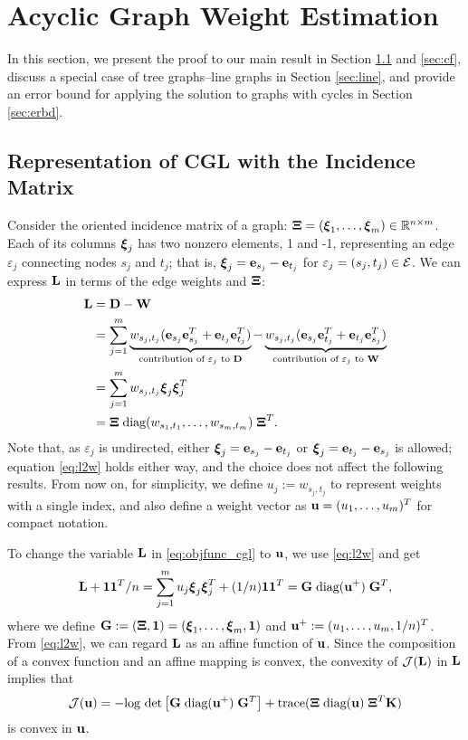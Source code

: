 \documentclass{article}
\begin{document}
\section{Acyclic Graph Weight Estimation}
\label{sec:glpest}
In this section, we present the proof to our main result in Section \ref{sec:represent} and \ref{sec:cf}, discuss a special case of tree graphs--line graphs in Section \ref{sec:line}, and provide an error bound for applying the solution to graphs with cycles in Section \ref{sec:erbd}.

\subsection{Representation of CGL with the Incidence Matrix}
\label{sec:represent}
Consider the oriented incidence matrix of a graph: $\hbox{\boldmath$\Xi$}=(\hbox{\boldmath$\xi$}_1,\dots,\hbox{\boldmath$\xi$}_m)\in\mathbb{R}^{n\times m}$. Each of its columns $\hbox{\boldmath$\xi$}_j$  has two nonzero elements, 1 and -1,  representing an edge $\varepsilon_j$ connecting nodes $s_j$ and $t_j$; that is, $\hbox{\boldmath$\xi$}_j={\bf e}_{s_j}-{\bf e}_{t_j}$ for $\varepsilon_j=(s_j,t_j)\in{\cal E}$. We can express ${\bf L}$ in terms of the edge weights and $\hbox{\boldmath$\Xi$}$:
\begin{align}
\label{eq:l2w}
  {\bf L} &= {\bf D}-{\bf W} \nonumber\\ 
  &=\sum_{j=1}^m \underbrace{w_{s_j,t_j}({\bf e}_{s_j}{\bf e}_{s_j}^T+{\bf e}_{t_j}{\bf e}_{t_j}^T)}_{\text{contribution of $\varepsilon_j$ to ${\bf D}$}} - \underbrace{w_{s_j,t_j}({\bf e}_{s_j}{\bf e}_{t_j}^T + {\bf e}_{t_j}{\bf e}_{s_j}^T)}_{\text{contribution of $\varepsilon_j$ to ${\bf W}$}} \nonumber\\
  &= \sum_{j=1}^m w_{s_j,t_j}\hbox{\boldmath$\xi$}_j\hbox{\boldmath$\xi$}_j^T \nonumber\\
  &= \hbox{\boldmath$\Xi$}\;\text{diag}(w_{s_1,t_1},\dots,w_{s_m,t_m})\;\hbox{\boldmath$\Xi$}^T.
\end{align}
Note that, as $\varepsilon_j$ is undirected, either $\hbox{\boldmath$\xi$}_j={\bf e}_{s_j}-{\bf e}_{t_j}$ or $\hbox{\boldmath$\xi$}_j={\bf e}_{t_j}-{\bf e}_{s_j}$ is allowed; equation \eqref{eq:l2w} holds either way, and the choice does not affect  the following results. From now on, for simplicity, we define $u_j:=w_{s_j,t_j}$ to represent weights with a single index, and also define a weight vector as ${\bf u}=(u_1,\dots,u_m)^T$ for compact notation.

To change the variable ${\bf L}$ in \eqref{eq:objfunc_cgl} to ${\bf u}$, we use \eqref{eq:l2w} and get
\begin{equation}
\label{eq:l_cgl}
  {\bf L}+{\bf 1}{\bf 1}^T/n
  =\sum_{j=1}^m u_j\hbox{\boldmath$\xi$}_j\hbox{\boldmath$\xi$}_j^T + (1/n){\bf 1}{\bf 1}^T
  = {\bf G}\;\text{diag}({\bf u}^+)\;{\bf G}^T,
\end{equation}
where we define ${\bf G}:=(\hbox{\boldmath$\Xi$}, {\bf 1})=(\hbox{\boldmath$\xi$}_1,\dots,\hbox{\boldmath$\xi$}_m,{\bf 1})$ and ${\bf u}^+:=(u_1,\dots,u_m,1/n)^T$. From \eqref{eq:l2w}, we can regard ${\bf L}$ as an affine function of ${\bf u}$. Since the composition of a convex function and an affine mapping is convex, the convexity of ${\cal J}({\bf L})$ in ${\bf L}$ implies that 
\[
  {\cal J}({\bf u}) = -\text{log det}\left[{\bf G}\;\text{diag}({\bf u}^+)\;{\bf G}^T\right] + \text{trace}(\hbox{\boldmath$\Xi$}\;\text{diag}({\bf u})\;\hbox{\boldmath$\Xi$}^T{\bf K})
\]
is convex in ${\bf u}$. 
\end{document}
